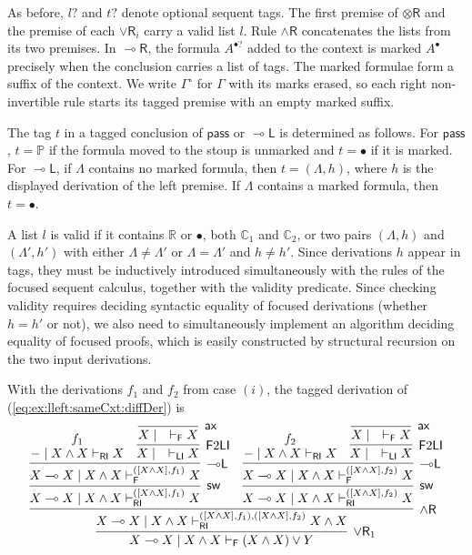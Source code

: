 \documentclass[submission,copyright,creativecommons]{eptcs}
\theoremstyle{definition}
\newcommand{\tr}{\otimes \mathsf{R}}
\newcommand{\lright}{{\multimap}\mathsf{R}}
\newcommand{\lleft}{{\multimap}\mathsf{L}}
\newcommand{\pass}{\mathsf{pass}}
\newcommand{\andr}{\land \mathsf{R}}
\newcommand{\orrone}{\lor \mathsf{R}_{1}}
\newcommand{\orri}{\lor \mathsf{R}_{i}}
\newcommand{\ax}{\mathsf{ax}}
\newcommand{\lolli}{\multimap}
\newcommand{\RI}{\mathsf{RI}}
\newcommand{\LI}{\mathsf{LI}}
\newcommand{\F}{\mathsf{F}}
\newcommand{\sw}{\mathsf{sw}}
\newcommand{\tP}{\mathbb{P}}
\newcommand{\tCone}{\mathbb{C}_1}
\newcommand{\tCtwo}{\mathbb{C}_2}
\newcommand{\tE}{\mathbb{R}}
\begin{document}
As before, $l?$ and $t?$ denote optional sequent tags. The first premise of $\tr$ and the premise of each $\orri$ carry a valid list $l$. Rule $\andr$ concatenates the lists from its two premises. In $\lright$, the formula $A^{\bullet?}$ added to the context is marked $A^\bullet$ precisely when the conclusion carries a list of tags. The marked formulae form a suffix of the context. We write $\Gamma^\circ$ for $\Gamma$ with its marks erased, so each right non-invertible rule starts its tagged premise with an empty marked suffix.

The tag $t$ in a tagged conclusion of $\pass$ or $\lleft$ is determined as follows. For $\pass$, $t=\tP$ if the formula moved to the stoup is unmarked and $t=\bullet$ if it is marked. For $\lleft$, if $\Lambda$ contains no marked formula, then $t=(\Lambda,h)$, where $h$ is the displayed derivation of the left premise. If $\Lambda$ contains a marked formula, then $t=\bullet$.

A list $l$ is valid if it contains $\tE$ or $\bullet$, both $\tCone$ and $\tCtwo$, or two pairs $(\Lambda,h)$ and $(\Lambda',h')$ with either $\Lambda\ne\Lambda'$ or $\Lambda=\Lambda'$ and $h\ne h'$.
Since derivations $h$ appear in tags, they must be inductively introduced simultaneously with the rules of the focused sequent calculus, together with the validity predicate. Since checking validity requires deciding syntactic equality of focused derivations (whether $h = h'$ or not), we also need to simultaneously implement an algorithm deciding equality of focused proofs, which is easily constructed by structural recursion on the two input derivations.

With the derivations $f_1$ and $f_2$ from case $(i)$, the tagged derivation of (\ref{eq:ex:lleft:sameCxt:diffDer}) is
\[
  \begin{array}{c}
    \infer[\orrone]{X \lolli X \mid X \land X \vdash_\F (X \land X) \lor Y}{
    \infer[\andr]{X \lolli X \mid X \land X \vdash^{([X\land X],f_1), ([X\land X],f_2)}_\RI X \land X}{
      \infer[\sw]{X \lolli X \mid X \land X \vdash^{([X\land X],f_1)}_\RI X}{
        \infer[\lleft]{X \lolli X \mid X \land X \vdash^{([X\land X],f_1)}_\F X}{
          \deduce{{-} \mid X \land X \vdash_\RI X}{f_1} &
          \infer[\F 2 \LI]{X \mid \quad \vdash_\LI X}{\infer[\ax]{X \mid \quad \vdash_\F X}{}}
        }
      } &
      \infer[\sw]{X \lolli X \mid X \land X \vdash^{([X\land X],f_2)}_\RI X}{
        \infer[\lleft]{X \lolli X \mid X \land X \vdash^{([X\land X],f_2)}_\F X}{
          \deduce{{-} \mid X \land X \vdash_\RI X}{f_2} &
          \infer[\F 2 \LI]{X \mid \quad \vdash_\LI X}{\infer[\ax]{X \mid \quad \vdash_\F X}{}}
        }
      }
    } %
  }
  \end{array}
\]
\end{document}
